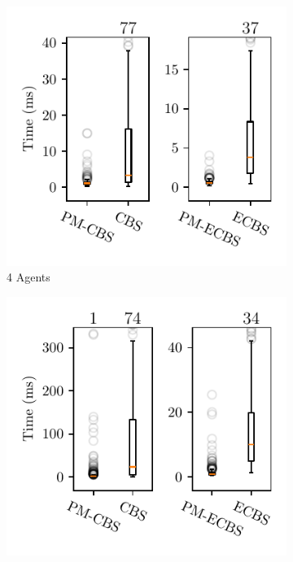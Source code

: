 \documentclass[letterpaper, 10 pt, conference]{ieeeconf}  %
\begin{document}
\begin{figure}[bt]
    \centering
    \begin{subfigure}[b]{.45\linewidth}
         \centering
         \includegraphics[width=\linewidth]{result/4_agents_time.pdf}
         \caption{4 Agents}
         \label{fig:timeR4}
     \end{subfigure}
     \begin{subfigure}[b]{.45\linewidth}
         \centering
         \includegraphics[width=\linewidth]{result/6_agents_time.pdf}

\end{subfigure}
\end{figure}
\end{document}
